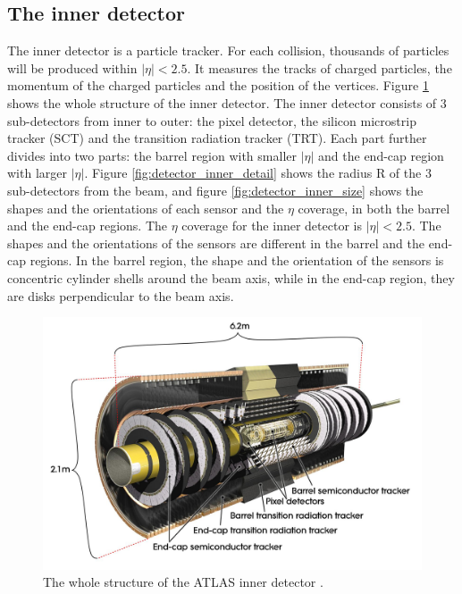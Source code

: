 \subsection{The inner detector}
The inner detector is a particle tracker.
For each collision, thousands of particles will be produced within $|\eta| < 2.5$.
It measures the tracks of charged particles, the momentum of the charged particles and the position of the vertices.
Figure \ref{fig:detector_inner_whole} shows the whole structure of the inner detector.
The inner detector consists of 3 sub-detectors from inner to outer: the pixel detector, the silicon microstrip tracker (SCT) and the transition radiation tracker (TRT).
Each part further divides into two parts: the barrel region with smaller $|\eta|$ and the end-cap region with larger $|\eta|$.
Figure \ref{fig:detector_inner_detail} shows the radius R of the 3 sub-detectors from the beam, and figure \ref{fig:detector_inner_size} shows the shapes and the orientations of each sensor and the $\eta$ coverage, in both the barrel and the end-cap regions.
The $\eta$ coverage for the inner detector is $|\eta| < 2.5$.
The shapes and the orientations of the sensors are different in the barrel and the end-cap regions.
In the barrel region, the shape and the orientation of the sensors is concentric cylinder shells around the beam axis, while in the end-cap region, they are disks perpendicular to the beam axis.
\begin{figure}
\centering
\includegraphics[width=\textwidth]{data/photo/detector/inner_whole.jpg}
\caption{The whole structure of the ATLAS inner detector \cite{inner_photo}.}
\label{fig:detector_inner_whole}
\end{figure}
